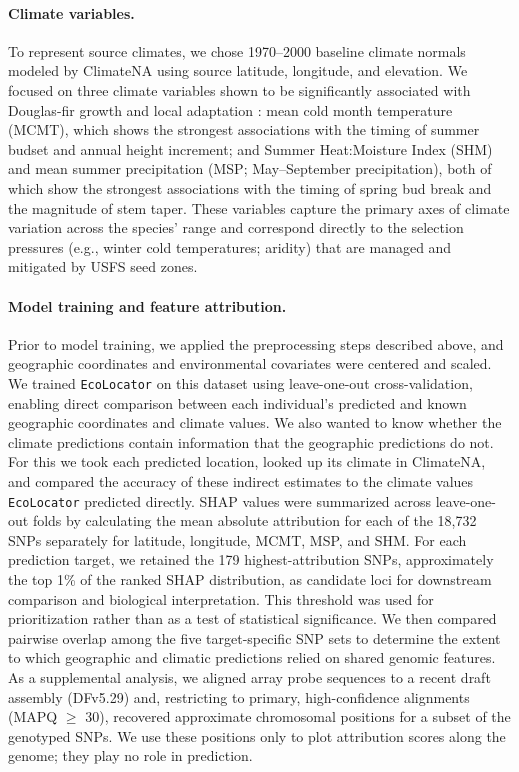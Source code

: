 \documentclass[]{article}
\newcommand{\dfir}{Douglas-fir\xspace}
\newcommand{\ecolocator}{\texttt{EcoLocator}\xspace}
\begin{document}
\paragraph{Climate variables.}
To represent source climates,
we chose 1970--2000 baseline climate normals modeled by
ClimateNA \citep{mahony_global_2022} using source latitude, longitude, and elevation.
We focused on three climate variables shown to be significantly
associated with \dfir growth and local adaptation \citep{stclair_genecology_2005}:
mean cold month temperature (MCMT), which shows the strongest
associations with the timing of summer budset and annual height
increment; and Summer Heat:Moisture Index (SHM) and mean summer
precipitation (MSP; May--September precipitation),
both of which show the strongest associations with
the timing of spring bud break and the magnitude of stem taper.
These variables capture the primary axes of climate variation
across the species' range and correspond directly to the selection
pressures (e.g., winter cold temperatures; aridity) that are
managed and mitigated by USFS seed zones.

\paragraph{Model training and feature attribution.}
Prior to model training,
we applied the preprocessing steps described above,
and geographic coordinates and environmental covariates
were centered and scaled.
We trained \ecolocator on this dataset
using leave-one-out cross-validation,
enabling direct comparison between
each individual's predicted and known
geographic coordinates and climate values.
We also wanted to know whether the climate predictions
contain information that the geographic predictions do not.
For this we took each predicted location, looked up its climate in ClimateNA,
and compared the accuracy of these indirect estimates
to the climate values \ecolocator predicted directly.
SHAP values were summarized across leave-one-out
folds by calculating the mean absolute attribution
for each of the 18,732 SNPs separately for latitude, longitude,
MCMT, MSP, and SHM. For each prediction target,
we retained the 179 highest-attribution SNPs,
approximately the top 1\% of the ranked SHAP distribution,
as candidate loci for downstream comparison and biological interpretation.
This threshold was used for prioritization rather than as a test of
statistical significance. We then compared pairwise overlap
among the five target-specific SNP sets to determine the extent
to which geographic and climatic predictions relied on shared genomic features.
As a supplemental analysis, we aligned array probe sequences to a recent
draft assembly (DFv5.29) and, restricting to primary,
high-confidence alignments (MAPQ $\geq$ 30), recovered approximate
chromosomal positions for a subset of the genotyped SNPs.
We use these positions only to plot attribution scores along the genome;
they play no role in prediction.
\end{document}
